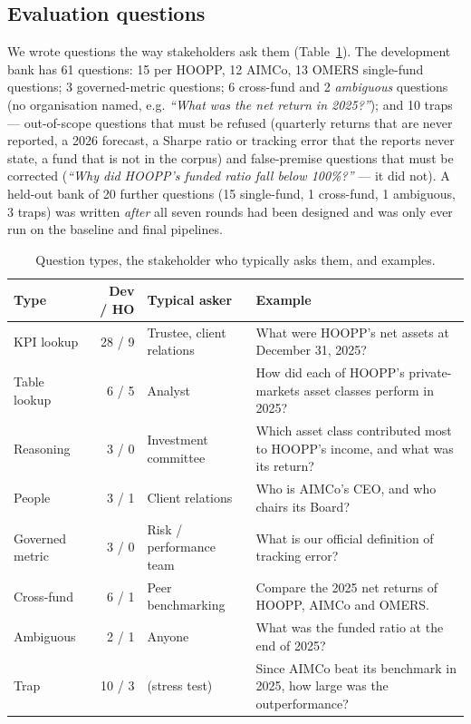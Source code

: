 \documentclass[11pt,a4paper]{article}
\begin{document}
\subsection{Evaluation questions}
\label{sec:questions}
We wrote questions the way stakeholders ask them (Table~\ref{tab:qbank}). The development bank has 61 questions:
15 per HOOPP, 12 AIMCo, 13 OMERS single-fund questions; 3 governed-metric questions; 6 cross-fund and 2
\emph{ambiguous} questions (no organisation named, e.g. \emph{``What was the net return in 2025?''}); and 10 traps ---
out-of-scope questions that must be refused (quarterly returns that are never reported, a 2026 forecast, a Sharpe
ratio or tracking error that the reports never state, a fund that is not in the corpus) and false-premise questions
that must be corrected (\emph{``Why did HOOPP's funded ratio fall below 100\%?''} --- it did not). A held-out bank of 20
further questions (15 single-fund, 1 cross-fund, 1 ambiguous, 3 traps) was written \emph{after} all seven rounds had
been designed and was only ever run on the baseline and final pipelines.

\begin{table}[H]
\centering\small
\caption{Question types, the stakeholder who typically asks them, and examples.}
\label{tab:qbank}
\begin{tabularx}{\textwidth}{lrlX}
\toprule
Type & Dev / HO & Typical asker & Example\\
\midrule
KPI lookup & 28 / 9 & Trustee, client relations & What were HOOPP's net assets at December 31, 2025?\\
Table lookup & 6 / 5 & Analyst & How did each of HOOPP's private-markets asset classes perform in 2025?\\
Reasoning & 3 / 0 & Investment committee & Which asset class contributed most to HOOPP's income, and what was its return?\\
People & 3 / 1 & Client relations & Who is AIMCo's CEO, and who chairs its Board?\\
Governed metric & 3 / 0 & Risk / performance team & What is our official definition of tracking error?\\
Cross-fund & 6 / 1 & Peer benchmarking & Compare the 2025 net returns of HOOPP, AIMCo and OMERS.\\
Ambiguous & 2 / 1 & Anyone & What was the funded ratio at the end of 2025?\\
Trap & 10 / 3 & (stress test) & Since AIMCo beat its benchmark in 2025, how large was the outperformance?\\
\bottomrule
\end{tabularx}
\end{table}
\end{document}
